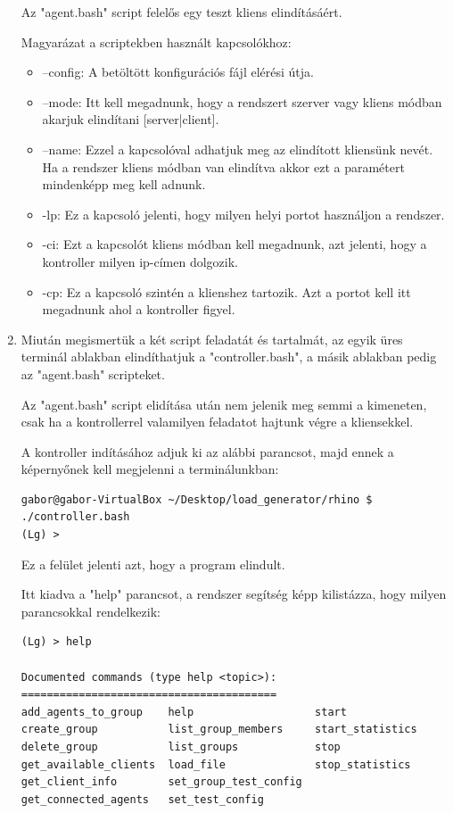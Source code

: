 \documentclass[a4paper,12pt,oneside]{report}
\begin{document}
\begin{enumerate}
Az "agent.bash" script felelős egy teszt kliens elindításáért.

Magyarázat a scriptekben használt kapcsolókhoz:

\begin{itemize}
\itemsep0em
	\item --config: A betöltött konfigurációs fájl elérési útja.
	\item --mode: Itt kell megadnunk, hogy a rendszert szerver vagy kliens módban akarjuk elindítani [server|client].
	\item --name: Ezzel a kapcsolóval adhatjuk meg az elindított kliensünk nevét. Ha a rendszer kliens módban van elindítva akkor ezt a paramétert mindenképp meg kell adnunk.
	\item -lp: Ez a kapcsoló jelenti, hogy milyen helyi portot használjon a rendszer.
	\item -ci: Ezt a kapcsolót kliens módban kell megadnunk, azt jelenti, hogy a kontroller milyen ip-címen dolgozik.
	\item -cp: Ez a kapcsoló szintén a klienshez tartozik. Azt a portot kell itt megadnunk ahol a kontroller figyel.
\end{itemize}

\item Miután megismertük a két script feladatát és tartalmát, az egyik üres terminál ablakban elindíthatjuk a "controller.bash", a másik ablakban pedig az "agent.bash" scripteket.

Az "agent.bash" script elidítása után nem jelenik meg semmi a kimeneten, csak ha a kontrollerrel valamilyen feladatot hajtunk végre a kliensekkel.

A kontroller indításához adjuk ki az alábbi parancsot, majd ennek a képernyőnek kell megjelenni a terminálunkban:

\begin{lstlisting}
gabor@gabor-VirtualBox ~/Desktop/load_generator/rhino $ ./controller.bash 
(Lg) > 
\end{lstlisting}

Ez a felület jelenti azt, hogy a program elindult.

Itt kiadva a "help" parancsot, a rendszer segítség képp kilistázza, hogy milyen parancsokkal rendelkezik:

\begin{lstlisting}
(Lg) > help

Documented commands (type help <topic>):
========================================
add_agents_to_group    help                   start           
create_group           list_group_members     start_statistics
delete_group           list_groups            stop            
get_available_clients  load_file              stop_statistics 
get_client_info        set_group_test_config
get_connected_agents   set_test_config      


\end{lstlisting}
\end{enumerate}
\end{document}
